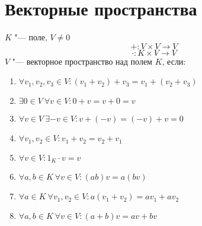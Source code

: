 
\section{Векторные пространства}

\begin{Def}
	$K$ "--- поле, $V \ne 0$
	\[ + \colon V \times V \to V \]
	\[ \cdot \colon K \times V \to V \]
	$V$ "--- векторное пространство над полем $K$, если:
	\begin{enumerate}
	\item
		$\forall v_1, v_2, v_3 \in V \colon (v_1 + v_2) + v_3 = v_1 + (v_2 + v_3)$
	\item
		$\exists 0 \in V ~ \forall v \in V \colon 0 + v = v + 0 = v$
	\item
		$\forall v \in V ~ \exists -v \in V \colon v + (-v) = (-v) + v = 0$
	\item
		$\forall v_1, v_2 \in V \colon v_1 + v_2 = v_2 + v_1$
	\item
		$\forall v \in V \colon 1_{K} \cdot v = v$
	\item
		$\forall a,b \in K ~ \forall v \in V \colon (ab)v = a(bv)$
	\item
		$\forall a \in K ~ \forall v_1, v_2 \in V \colon a(v_1 + v_2) = av_1 + av_2$
	\item
		$\forall a,b \in K ~ \forall v \in V \colon (a + b)v = av + bv$
	\end{enumerate}
\end{Def}

